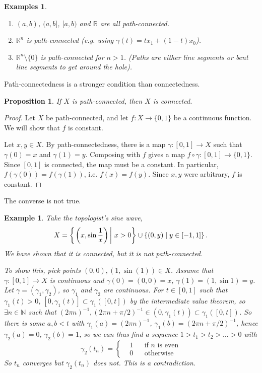 \documentclass{article}
\theoremstyle{plain}\theoremheaderfont{\normalfont\itshape}\theorembodyfont{\rmfamily}\theoremseparator{.}\newtheorem*{rem}{Remark}\newtheorem*{ex}{Example}\newtheorem*{proof}{Proof}\newtheorem*{altp}{Alternative proof}
\theoremstyle{plain}\theoremheaderfont{\normalfont\bfseries}\theorembodyfont{\rmfamily}\theoremseparator{.}\newtheorem{thm}{Theorem}[section]\newtheorem{lem}[thm]{Lemma}\newtheorem{prop}[thm]{Proposition}\newtheorem*{cor}{Corollary}\newtheorem{defn}[thm]{Definition}\newtheorem{clm}[thm]{Claim}\newtheorem{clminproof}{Claim}
\theoremstyle{break}\theoremheaderfont{\normalfont\itshape}\theorembodyfont{\rmfamily}\theoremseparator{.\medskip}\newtheorem*{proofskip}{Proof}\newtheorem*{exs}{Examples}\newtheorem*{rems}{Remarks}
\theoremstyle{break}\theoremheaderfont{\normalfont\bfseries}\theorembodyfont{\rmfamily}\theoremseparator{.\medskip}\newtheorem{lemskip}[thm]{Lemma}\newtheorem{defnskip}[thm]{Definition}\newtheorem{propskip}[thm]{Proposition}\newtheorem{thmskip}[thm]{Theorem}
\begin{document}
    \begin{exs}
        \begin{enumerate}[label=(\roman*),topsep=0pt]
            \item \((a,b)\), \((a,b]\), \([a,b)\) and \(\mathbb{R}\) are all path-connected.
            \item \(\mathbb{R}^n\) is path-connected (e.g. using \(\gamma(t)=tx_1+(1-t)x_0\)).
            \item \(\mathbb{R}^n\setminus\{0\}\) is path-connected for \(n>1\). (Paths are either line segments or bent line segments to get around the hole).
        \end{enumerate}
    \end{exs}

    Path-connectedness is a stronger condition than connectedness.

    \begin{prop}
        If \(X\) is path-connected, then \(X\) is connected.
    \end{prop}
    \begin{proof}
        Let \(X\) be path-connected, and let \(f:X\to\{0,1\}\) be a continuous function. We will show that \(f\) is constant.

        Let \(x,y\in X\). By path-connectedness, there is a map \(\gamma:[0,1]\to X\) such that \(\gamma(0)=x\) and \(\gamma(1)=y\). Composing with \(f\) gives a map \(f\circ\gamma:[0,1]\to\{0,1\}\). Since \([0,1]\) is connected, the map must be a constant. In particular, \(f(\gamma(0))=f(\gamma(1))\), i.e. \(f(x)=f(y)\). Since \(x,y\) were arbitrary, \(f\) is constant.
    \end{proof}

    The converse is not true.

    \begin{ex}
        Take the topologist's sine wave,
        \[X=\qty{\left.\qty(x,\sin\frac{1}{x})\,\right|\,x>0}\cup\{(0,y)\mid y\in[-1,1]\}\,.\]
        We have shown that it is connected, but it is not path-connected.

        To show this, pick points \((0,0),(1,\sin(1))\in X\). Assume that \(\gamma:[0,1]\to X\) is continuous and \(\gamma(0)=(0,0)=x\), \(\gamma(1)=(1,\sin 1)=y\). Let \(\gamma=(\gamma_1,\gamma_2)\), so \(\gamma_1\) and \(\gamma_2\) are continuous. For \(t\in[0,1]\) such that \(\gamma_1(t)>0\), \([0,\gamma_1(t)]\subset\gamma_1([0,t])\) by the intermediate value theorem, so \(\exists n\in\mathbb{N}\) such that \((2\pi n)^{-1},(2\pi n+\pi/2)^{-1}\in(0,\gamma_1(t))\subset\gamma_1([0,t])\). So there is some \(a,b<t\) with \(\gamma_1(a)=(2\pi n)^{-1}\), \(\gamma_1(b)=(2\pi n+\pi/2)^{-1}\), hence \(\gamma_2(a)=0\), \(\gamma_2(b)=1\), so we can thus find a sequence \(1>t_1>t_2>\dots>0\) with
        \[\gamma_2(t_n)=\left\{\begin{aligned}
            &1 && \text{if }n\text{ is even}\\
            &0 && \text{otherwise}
        \end{aligned}\right.\]
        So \(t_n\) converges but \(\gamma_2(t_n)\) does not. This is a contradiction.
    \end{ex}
\end{document}
